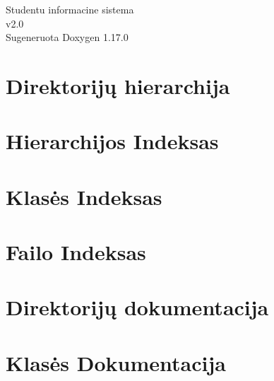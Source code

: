 \documentclass[twoside]{book}
\newcommand{\+}{\discretionary{\mbox{\scriptsize$\hookleftarrow$}}{}{}}
\newcommand{\clearemptydoublepage}{%
    \newpage{\pagestyle{empty}\cleardoublepage}%
  }
\begin{document}
  \raggedbottom
    \hypersetup{pageanchor=false,
                bookmarksnumbered=true,
                pdfencoding=unicode
               }
  \begin{titlepage}
  \vspace*{7cm}
  \begin{center}%
  {\Large Studentu informacine sistema}\\
  [1ex]\large v2.\+0 \\
  \vspace*{1cm}
  {\large Sugeneruota Doxygen 1.17.0}\\
  \end{center}
  \end{titlepage}
  \clearemptydoublepage
  \tableofcontents
  \clearemptydoublepage
  \hypersetup{pageanchor=true}

\chapter{Direktorijų hierarchija}

\chapter{Hierarchijos Indeksas}

\chapter{Klasės Indeksas}

\chapter{Failo Indeksas}

\chapter{Direktorijų dokumentacija}

\chapter{Klasės Dokumentacija}



\end{document}
